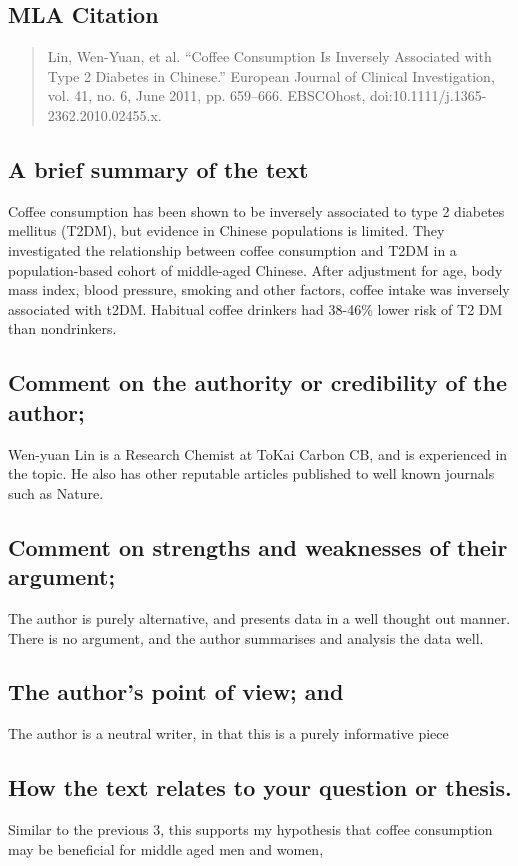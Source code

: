 \documentclass{scrartcl}
\begin{document}
\subsection{MLA Citation}
\label{sec:org8dc4924}
\begin{quote}
Lin, Wen-Yuan, et al. “Coffee Consumption Is Inversely Associated with Type 2 Diabetes in Chinese.” European Journal of Clinical Investigation, vol. 41, no. 6, June 2011, pp. 659–666. EBSCOhost, doi:10.1111/j.1365-2362.2010.02455.x.
\end{quote}
\subsection{A brief summary of the text}
\label{sec:orgb3d1021}
Coffee consumption has been shown to be inversely associated to type 2 diabetes mellitus (T2DM), but evidence in Chinese populations is limited. They investigated the relationship between coffee consumption and T2DM in a population-based cohort of middle-aged Chinese. After adjustment for age, body mass index, blood pressure, smoking and other factors, coffee intake was  inversely associated with t2DM. Habitual coffee drinkers had 38-46\% lower risk of T2 DM than nondrinkers.
\subsection{Comment on the authority or credibility of the author;}
\label{sec:org6916335}
Wen-yuan Lin is a Research Chemist at ToKai Carbon CB, and is experienced in the topic. He also has other reputable articles published to well known journals such as Nature.
\subsection{Comment on strengths and weaknesses of their argument;}
\label{sec:org5f72897}
The author is purely alternative, and presents data in a well thought out manner. There is no argument, and the author summarises and analysis the data well.
\subsection{The author’s point of view; and}
\label{sec:orgd29729e}
The author is a neutral writer, in that this is a purely informative piece
\subsection{How the text relates to your question or thesis.}
\label{sec:org7a951b9}
Similar to the previous 3, this supports my hypothesis that coffee consumption may be beneficial for middle aged men and women,
\end{document}
